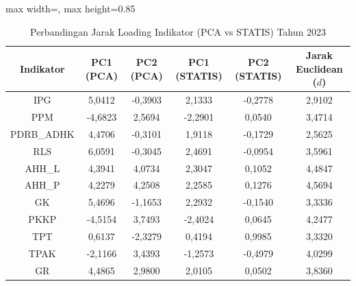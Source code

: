\begin{table}[H]
\centering
\caption{Perbandingan Jarak Loading Indikator (PCA vs STATIS) Tahun 2023} \label{tab:app1jarak_loading_2023}
\begin{adjustbox}{max width=\textwidth, max height=0.85\textheight}
\begin{tabular}{|c|c|c|c|c|c|}
\hline
\textbf{Indikator} & \textbf{PC1 (PCA)} & \textbf{PC2 (PCA)} & \textbf{PC1 (STATIS)} & \textbf{PC2 (STATIS)} & \textbf{Jarak Euclidean ($d$)} \\
\hline
IPG & 5,0412 & -0,3903 & 2,1333 & -0,2778 & 2,9102 \\
PPM & -4,6823 & 2,5694 & -2,2901 & 0,0540 & 3,4714 \\
PDRB\_ADHK & 4,4706 & -0,3101 & 1,9118 & -0,1729 & 2,5625 \\
RLS & 6,0591 & -0,3045 & 2,4691 & -0,0954 & 3,5961 \\
AHH\_L & 4,3941 & 4,0734 & 2,3047 & 0,1052 & 4,4847 \\
AHH\_P & 4,2279 & 4,2508 & 2,2585 & 0,1276 & 4,5694 \\
GK & 5,4696 & -1,1653 & 2,2932 & -0,1540 & 3,3336 \\
PKKP & -4,5154 & 3,7493 & -2,4024 & 0,0645 & 4,2477 \\
TPT & 0,6137 & -2,3279 & 0,4194 & 0,9985 & 3,3320 \\
TPAK & -2,1166 & 3,4393 & -1,2573 & -0,4979 & 4,0299 \\
GR & 4,4865 & 2,9800 & 2,0105 & 0,0502 & 3,8360 \\
\hline
\end{tabular}
\end{adjustbox}
\end{table}